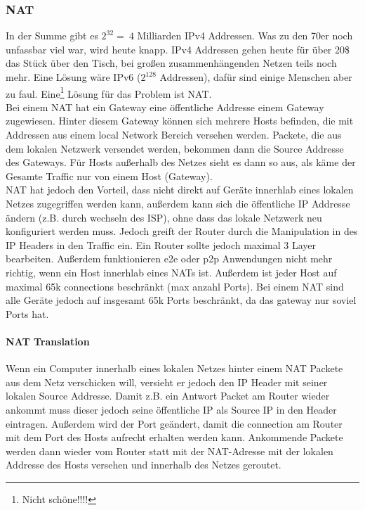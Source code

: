         \subsubsection{NAT}
            In der Summe gibt es $2^{32} = ~4$ Milliarden IPv4 Addressen. Was zu den 70er noch unfassbar viel war, wird heute knapp. IPv4 Addressen gehen heute für über 20\$ das Stück über den Tisch, bei großen zusammenhängenden Netzen teils noch mehr. Eine Lösung wäre IPv6 ($2^{128}$ Addressen), dafür sind einige Menschen aber zu faul. Eine\footnote{Nicht schöne!!!!} Lösung für das Problem ist NAT. \\
            Bei einem NAT hat ein Gateway eine öffentliche Addresse einem Gateway zugewiesen. Hinter diesem Gateway können sich mehrere Hosts befinden, die mit Addressen aus einem local Network Bereich versehen werden. Packete, die aus dem lokalen Netzwerk versendet werden, bekommen dann die Source Addresse des Gateways. Für Hosts außerhalb des Netzes sieht es dann so aus, als käme der Gesamte Traffic nur von einem Host (Gateway). \\
            NAT hat  jedoch den Vorteil, dass nicht direkt auf Geräte innerhlab eines lokalen Netzes zugegriffen werden kann, außerdem kann sich die öffentliche IP Addresse ändern (z.B. durch wechseln des ISP), ohne dass das lokale Netzwerk neu konfiguriert werden muss. Jedoch greift der Router durch die Manipulation in des IP Headers in den Traffic ein. Ein Router sollte jedoch maximal 3 Layer bearbeiten. Außerdem funktionieren e2e oder p2p Anwendungen nicht mehr richtig, wenn ein Host innerhlab eines NATs ist. Außerdem ist jeder Host auf maximal 65k connections beschränkt (max anzahl Ports). Bei einem NAT sind alle Geräte jedoch auf insgesamt 65k Ports beschränkt, da das gateway nur soviel Ports hat.

            \paragraph{NAT Translation}
                Wenn ein Computer innerhalb eines lokalen Netzes hinter einem NAT Packete aus dem Netz verschicken will, versieht er jedoch den IP Header mit seiner lokalen Source Addresse. Damit z.B. ein Antwort Packet am Router wieder ankommt muss dieser jedoch seine öffentliche IP als Source IP in den Header eintragen. Außerdem wird der Port geändert, damit die connection am Router mit dem Port des Hosts aufrecht erhalten werden kann. Ankommende Packete werden dann wieder vom Router statt mit der NAT-Adresse mit der lokalen Addresse des Hosts versehen und innerhalb des Netzes geroutet. 


